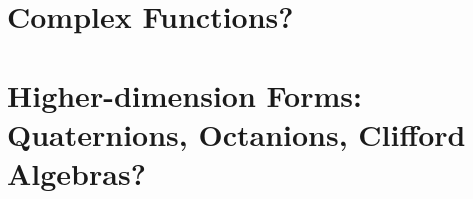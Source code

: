 \documentclass{article}
\begin{document}
\section{Complex Functions?}
\section{Higher-dimension Forms: Quaternions, Octanions, Clifford Algebras?}
\end{document}
